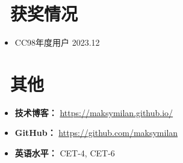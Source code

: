 \documentclass[11pt]{article}
\begin{document}
\section{\makebox[\widthof{\faGraduationCap}][c]{\color{CVBlue}\faList}\ 获奖情况}
\begin{itemize}
    \item CC98年度用户 \hfill 2023.12
    
\end{itemize}
    
\section{\makebox[\widthof{\faInfo}][c]{\color{CVBlue}\faInfo}\ 其他}
\begin{itemize}[parsep=0.5ex]
    \item \textbf{技术博客：} \href{https://maksymilan.github.io/}{https://maksymilan.github.io/}
    \item \textbf{GitHub：} \href{https://github.com/maksymilan}{https://github.com/maksymilan} 
    \item \textbf{英语水平：} CET-4, CET-6
\end{itemize}
\end{document}
